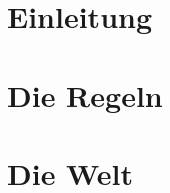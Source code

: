 

\title{}
\author{%
      Autor: Marco Behnke\\
      Seitenumfang: \pageref{TotalPages}\\
      }


        \sffamily
        \frontmatter
                \begin{titlepage}
                	\maketitle
                \end{titlepage}
                \setcounter{section}{-1}
                

                \tableofcontents
                \newpage
        \mainmatter
                \part{Einleitung}
                        
                        
                        \newpage
                \part{Die Regeln}
                        
                        
                        
                        
                        \newpage
                \part{Die Welt}
                        
                        
                        
                        
                        
                        
                        
                        
        \backmatter
                \appendix
